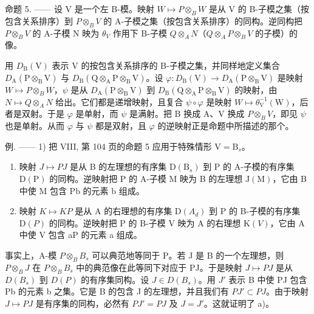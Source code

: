 命题 5. —— 设 V 是一个左 B-模。映射 \(W \mapsto P \otimes_{B} W\) 是从 V 的 B-子模之集（按包含关系排序）到 \(P \otimes_{B} V\) 的 A-子模之集（按包含关系排序）的同构。逆同构把 \(P \otimes_{B} V\) 的 A-子模 N 映为 \(\theta_{V}\) 作用下 B-子模 \(Q \otimes_{A} N\)（\(Q \otimes_{A} P \otimes_{B} V\) 的子模）的像。

用 \(D_{\mathrm{B}}(\mathrm{V})\) 表示 V 的按包含关系排序的 B-子模之集，并同样地定义集合 \(D_{\mathrm{A}}(\mathrm{P}\otimes_{\mathrm{B}}\mathrm{V})\) 与 \(D_{\mathrm{B}}(\mathrm{Q}\otimes_{\mathrm{A}}\mathrm{P}\otimes_{\mathrm{B}}\mathrm{V})\)。设 \(\varphi:D_{\mathrm{B}}(\mathrm{V})\to D_{\mathrm{A}}(\mathrm{P}\otimes_{\mathrm{B}}\mathrm{V})\) 是映射 \(W\mapsto P\otimes_{B}W\)，\(\psi\) 是从 \(D_{\mathrm{A}}(\mathrm{P}\otimes_{\mathrm{B}}\mathrm{V})\) 到 \(D_{\mathrm{B}}(\mathrm{Q}\otimes_{\mathrm{A}}\mathrm{P}\otimes_{\mathrm{B}}\mathrm{V})\) 的映射，由 \(N\mapsto Q\otimes_{A}N\) 给出。它们都是递增映射，且复合 \(\psi\circ\varphi\) 是映射 \(W\mapsto\theta_{\mathrm{V}}^{-1}(\mathrm{W})\)，后者是双射。于是 \(\varphi\) 是单射，而 \(\psi\) 是满射。把 B 换成 A、V 换成 \(P\otimes_{B}V\)，即见 \(\psi\) 也是单射。从而 \(\varphi\) 与 \(\psi\) 都是双射，且 \(\varphi\) 的逆映射正是命题中所描述的那个。

例. —— 1) 把 VIII, 第 104 页的命题 5 应用于特殊情形 \(\mathrm{V} = \mathrm{B}_s\)。

\begin{enumerate}
\def\labelenumi{\alph{enumi})}
\item
  映射 \(J \mapsto PJ\) 是从 B 的左理想的有序集 \(\mathrm{D}(\mathrm{B}_{s})\) 到 P 的 A-子模的有序集 \(\mathrm{D}(\mathrm{P})\) 的同构。逆映射把 P 的 A-子模 M 映为 B 的左理想 \(\mathrm{J}(\mathrm{M})\)，它由 B 中使 M 包含 Pb 的元素 b 组成。
\item
  映射 \(K \mapsto KP\) 是从 A 的右理想的有序集 \(\mathrm{D}(A_{d})\) 到 P 的 B-子模的有序集 \(\mathrm{D}(P)\) 的同构。逆映射把 P 的 B-子模 V 映为 A 的右理想 \(\mathrm{K}(V)\)，它由 A 中使 V 包含 aP 的元素 a 组成。
\end{enumerate}

事实上，A-模 \(P \otimes_{B} B_{s}\) 可以典范地等同于 P。若 J 是 B 的一个左理想，则 \(P \otimes_{B} J\) 在 \(P \otimes_{B} B_{s}\) 中的典范像在此等同下对应于 PJ。于是映射 \(J \mapsto PJ\) 是从 \(D(B_{s})\) 到 \(D(P)\) 的有序集同构。设 \(J \in D(B_{s})\)。用 \(J'\) 表示 B 中使 PJ 包含 Pb 的元素 b 之集。它是 B 的包含 J 的左理想，并且我们有 \(PJ' \subset PJ\)。由于映射 \(J \mapsto PJ\) 是有序集的同构，必然有 \(PJ' = PJ\) 及 \(J = J'\)。这就证明了 a)。

